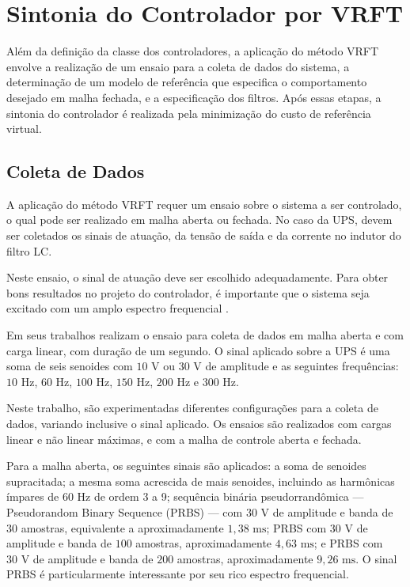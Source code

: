 \documentclass[repeatfields,oneside]{tcc}
\begin{document}
\section{Sintonia do Controlador por VRFT}

Além da definição da classe dos controladores, a aplicação do método VRFT envolve a realização de um ensaio para a coleta de dados do sistema, a determinação de um modelo de referência que especifica o comportamento desejado em malha fechada, e a especificação dos filtros.
Após essas etapas, a sintonia do controlador é realizada pela minimização do custo de referência virtual.

\subsection{Coleta de Dados}

A aplicação do método VRFT requer um ensaio sobre o sistema a ser controlado, o qual pode ser realizado em malha aberta ou fechada.
No caso da UPS, devem ser coletados os sinais de atuação, da tensão de saída e da corrente no indutor do filtro LC.

Neste ensaio, o sinal de atuação deve ser escolhido adequadamente.
Para obter bons resultados no projeto do controlador, é importante que o sistema seja excitado com um amplo espectro frequencial \cite{Bazanella2011}.

Em seus trabalhos \textcite{Corleta2015, Corleta2016, Bruna2020} realizam o ensaio para coleta de dados em malha aberta e com carga linear, com duração de um segundo.
O sinal aplicado sobre a UPS é uma soma de seis senoides com $10 \text{ V}$ ou $30 \text{ V}$ de amplitude e as seguintes frequências: $10 \text{ Hz}$, $60 \text{ Hz}$, $100 \text{ Hz}$, $150 \text{ Hz}$, $200 \text{ Hz}$ e $300 \text{ Hz}$.

Neste trabalho, são experimentadas diferentes configurações para a coleta de dados, variando inclusive o sinal aplicado.
Os ensaios são realizados com cargas linear e não linear máximas, e com a malha de controle aberta e fechada.

Para a malha aberta, os seguintes sinais são aplicados:
a soma de senoides supracitada;
a mesma soma acrescida de mais senoides, incluindo as harmônicas ímpares de $60 \text{ Hz}$ de ordem 3 a 9;
sequência binária pseudorrandômica --- Pseudorandom Binary Sequence (PRBS) --- com $30 \text{ V}$ de amplitude e banda de $30$ amostras, equivalente a aproximadamente $1,38 \text{ ms}$;
PRBS com $30 \text{ V}$ de amplitude e banda de $100$ amostras, aproximadamente $4,63 \text{ ms}$; e
PRBS com $30 \text{ V}$ de amplitude e banda de $200$ amostras, aproximadamente $9,26 \text{ ms}$.
O sinal PRBS é particularmente interessante por seu rico espectro frequencial.
\end{document}
